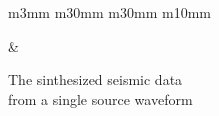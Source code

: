 \begin{figure}[t]
\begin{tabular}{m{3mm} m{30mm} m{30mm} m{10mm}}
\begin{minipage}[b]{\linewidth}
            \vspace{-7mm}
            \caption*{}
            \vspace{1mm}
        \end{minipage} &
        \hspace{-3mm}
         \\
    \end{tabular}
    \vspace{-2mm}
    \caption{ \centering The sinthesized seismic data \\ from a single source waveform}
    \vspace{-3mm}
    \label{fig:observed-seismic-data}
\end{figure}
